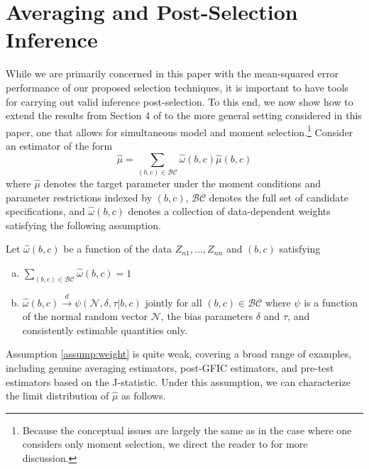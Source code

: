 \section{Averaging and Post-Selection Inference}

\label{sec:avg}
While we are primarily concerned in this paper with the mean-squared error performance of our proposed selection techniques, it is important to have tools for carrying out valid inference post-selection.
To this end, we now show how to extend the results from Section 4 of \cite{DiTraglia2012} to the more general setting considered in this paper, one that allows for simultaneous model and moment selection.\footnote{Because the conceptual issues are largely the same as in the case where one considers only moment selection, we direct the reader to \cite{DiTraglia2012} for more discussion.}
Consider an estimator of the form 
	$$\widehat{\mu} = \sum_{(b,c) \in \mathcal{BC}} \widehat{\omega}(b,c) \widehat{\mu}(b,c)$$
  where $\widehat{\mu}$ denotes the target parameter under the moment conditions and parameter restrictions indexed by $(b,c)$, $\mathcal{BC}$ denotes the full set of candidate specifications, and $\widehat{\omega}(b,c)$ denotes a collection of data-dependent weights satisfying the following assumption.
\begin{assump} Let $\widehat{\omega}(b,c)$ be a function of the data $Z_{n1}, \hdots, Z_{nn}$ and $(b,c)$ satisfying
	\begin{enumerate}[(a)] 
		\item $\sum_{(b,c) \in \mathcal{BC}} \widehat{\omega}(b,c) = 1$
		\item $\widehat{\omega}(b,c) \overset{d}{\rightarrow} \psi(\mathscr{N}, \delta, \tau|b,c)$ jointly for all $(b,c) \in \mathcal{BC}$ where $\psi$ is a function of the normal random vector $\mathscr{N}$, the bias parameters $\delta$ and $\tau$, and consistently estimable quantities only.
	\end{enumerate}
\label{assump:weight}
\end{assump}

Assumption \ref{assump:weight} is quite weak, covering a broad range of examples, including genuine averaging estimators, post-GFIC estimators, and pre-test estimators based on the J-statistic.
Under this assumption, we can characterize the limit distribution of $\widehat{\mu}$ as follows.

